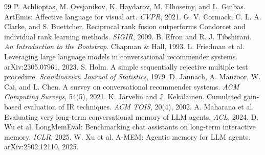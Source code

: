 \documentclass[10pt,a4paper,twocolumn]{article}
\begin{document}
\balance
\begin{thebibliography}{99}\small
{} P. Achlioptas, M. Ovsjanikov, K. Haydarov, M. Elhoseiny, and L. Guibas. ArtEmis: Affective language for visual art. \textit{CVPR}, 2021.
 G. V. Cormack, C. L. A. Clarke, and S. Buettcher. Reciprocal rank fusion outperforms Condorcet and individual rank learning methods. \textit{SIGIR}, 2009.
 B. Efron and R. J. Tibshirani. \textit{An Introduction to the Bootstrap}. Chapman \& Hall, 1993.
 L. Friedman et al. Leveraging large language models in conversational recommender systems. arXiv:2305.07961, 2023.
 S. Holm. A simple sequentially rejective multiple test procedure. \textit{Scandinavian Journal of Statistics}, 1979.
 D. Jannach, A. Manzoor, W. Cai, and L. Chen. A survey on conversational recommender systems. \textit{ACM Computing Surveys}, 54(5), 2021.
 K. J\"arvelin and J. Kek\"al\"ainen. Cumulated gain-based evaluation of IR techniques. \textit{ACM TOIS}, 20(4), 2002.
 A. Maharana et al. Evaluating very long-term conversational memory of LLM agents. \textit{ACL}, 2024.
 D. Wu et al. LongMemEval: Benchmarking chat assistants on long-term interactive memory. \textit{ICLR}, 2025.
 W. Xu et al. A-MEM: Agentic memory for LLM agents. arXiv:2502.12110, 2025.
\end{thebibliography}
\end{document}

